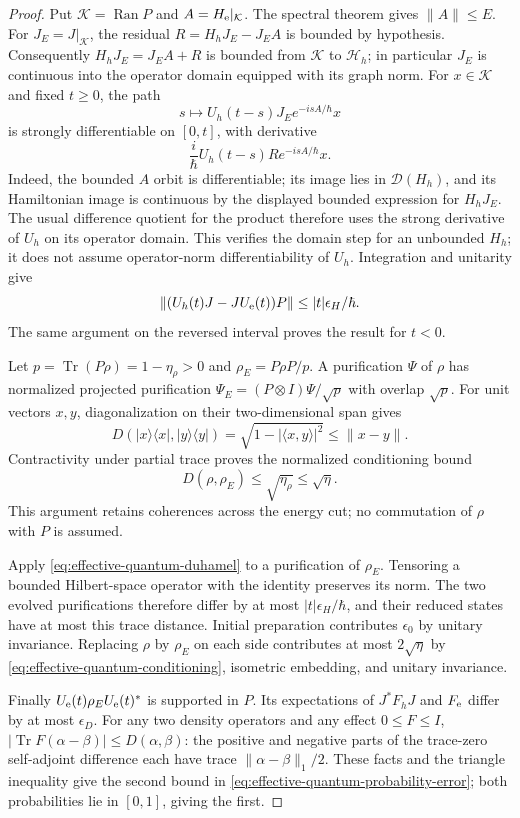 \begin{proof}
Put $\mathcal K=\operatorname{Ran}P$ and
$A=H_{\rm e}|_{\mathcal K}$. The spectral theorem gives
$\|A\|\leq E$. For $J_E=J|_{\mathcal K}$, the residual
$R=H_hJ_E-J_EA$ is bounded by hypothesis. Consequently
$H_hJ_E=J_EA+R$ is bounded from $\mathcal K$ to $\mathcal H_h$;
in particular $J_E$ is continuous into the operator domain equipped with
its graph norm. For $x\in\mathcal K$ and fixed $t\geq0$, the path
\[
 s\longmapsto U_h(t-s)J_Ee^{-isA/\hbar}x
\]
is strongly differentiable on $[0,t]$, with derivative
\[
 \frac{i}{\hbar}U_h(t-s)R e^{-isA/\hbar}x.
\]
Indeed, the bounded $A$ orbit is differentiable; its image lies in
$\mathcal D(H_h)$, and its Hamiltonian image is continuous by the
displayed bounded expression for $H_hJ_E$. The usual difference quotient
for the product therefore uses the strong derivative of $U_h$ on its
operator domain. This verifies the domain step for an unbounded $H_h$;
it does not assume operator-norm differentiability of $U_h$.
Integration and unitarity give
\begin{equation}
 \|(U_h(t)J-JU_{\rm e}(t))P\|
       \leq |t|\epsilon_H/\hbar.
 \label{eq:effective-quantum-duhamel}
\end{equation}
The same argument on the reversed interval proves the result for $t<0$.

Let $p=\operatorname{Tr}(P\rho)=1-\eta_\rho>0$ and
$\rho_E=P\rho P/p$. A purification $\Psi$ of $\rho$ has normalized
projected purification
$\Psi_E=(P\otimes I)\Psi/\sqrt p$ with overlap $\sqrt p$.
For unit vectors $x,y$, diagonalization on their two-dimensional span gives
\[
 D(|x\rangle\langle x|,|y\rangle\langle y|)
       =\sqrt{1-|\langle x,y\rangle|^2}\leq\|x-y\|.
\]
Contractivity under partial trace proves the normalized conditioning bound
\begin{equation}
 D(\rho,\rho_E)\leq\sqrt{\eta_\rho}\leq\sqrt\eta.
 \label{eq:effective-quantum-conditioning}
\end{equation}
This argument retains coherences across the energy cut; no commutation of
$\rho$ with $P$ is assumed.

Apply \eqref{eq:effective-quantum-duhamel} to a purification of $\rho_E$.
Tensoring a bounded Hilbert-space operator with the identity preserves its
norm. The two evolved purifications therefore differ by at most
$|t|\epsilon_H/\hbar$, and their reduced states have at most this trace
distance. Initial preparation contributes $\epsilon_0$ by unitary
invariance. Replacing $\rho$ by $\rho_E$ on each side contributes at most
$2\sqrt\eta$ by \eqref{eq:effective-quantum-conditioning}, isometric
embedding, and unitary invariance.

Finally $U_{\rm e}(t)\rho_EU_{\rm e}(t)^*$ is supported in $P$.
Its expectations of $J^*F_hJ$ and $F_{\rm e}$ differ by at most
$\epsilon_D$. For any two density operators and any effect $0\leq F\leq I$,
$|\operatorname{Tr}F(\alpha-\beta)|\leq D(\alpha,\beta)$: the positive
and negative parts of the trace-zero self-adjoint difference each have
trace $\|\alpha-\beta\|_1/2$. These facts and the triangle inequality give
the second bound in \eqref{eq:effective-quantum-probability-error}; both
probabilities lie in $[0,1]$, giving the first.
\end{proof}

